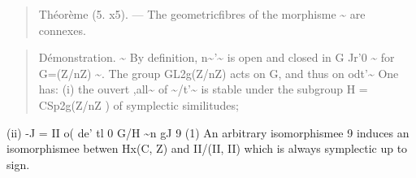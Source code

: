 \documentclass[11pt]{article}
\theoremstyle{plain}
\theoremstyle{definition}
\theoremstyle{remark}
\begin{document}
\begin{quote}Th\'eor\`eme (5. x5). --- The geometricfibres of the morphisme \textasciitilde{} are connexes.\end{quote}
\begin{quote}D\'emonstration. \textasciitilde{} By definition, n\textasciitilde{}'\textasciitilde{} is open and closed in G Jr'0 \textasciitilde{} for G=(Z/nZ) \textasciitilde{}. The group GL2g(Z/nZ) acts on G, and thus on odt'\textasciitilde{} One has: (i) the ouvert ,all\textasciitilde{} of \textasciitilde{}/t'\textasciitilde{} is stable under the subgroup H = CSp2g(Z/nZ ) of symplectic similitudes;\end{quote}
(ii) -J = II o( de' tl 0 G/H \textasciitilde{}n gJ 9 (1) An arbitrary isomorphismee 9 induces an isomorphismee betwen Hx(C, Z) and II/(II, II) which is always symplectic up to sign.
\end{document}
